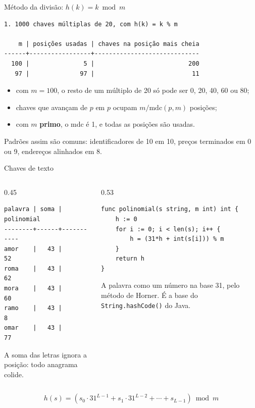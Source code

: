 \documentclass{beamer}
\begin{document}
\begin{frame}[fragile]{Método da divisão: $h(k) = k \bmod m$}
	\begin{verbatim}
1. 1000 chaves múltiplas de 20, com h(k) = k % m

    m | posições usadas | chaves na posição mais cheia
------+-----------------+-----------------------------
  100 |               5 |                          200
   97 |              97 |                           11
\end{verbatim}

	\vspace{0.2cm}
	\begin{itemize}
		\item com $m = 100$, o resto de um múltiplo de 20 só pode ser 0, 20, 40, 60
		      ou 80;
		\item chaves que avançam de $p$ em $p$ ocupam $m / \text{mdc}(p, m)$
		      posições;
		\item com $m$ \textbf{primo}, o mdc é 1, e todas as posições são usadas.
	\end{itemize}

	\vspace{0.2cm}
	\footnotesize Padrões assim são comuns: identificadores de 10 em 10, preços
	terminados em 0 ou 9, endereços alinhados em 8.
\end{frame}

\begin{frame}[fragile]{Chaves de texto}
	\begin{columns}
		\begin{column}{0.45\textwidth}
			\begin{verbatim}
palavra | soma | polinomial
--------+------+-----------
amor    |   43 |         52
roma    |   43 |         62
mora    |   43 |         60
ramo    |   43 |          8
omar    |   43 |         77
\end{verbatim}
			\footnotesize A soma das letras ignora a posição: todo anagrama colide.
		\end{column}
		\begin{column}{0.53\textwidth}
			\begin{verbatim}
func polinomial(s string, m int) int {
	h := 0
	for i := 0; i < len(s); i++ {
		h = (31*h + int(s[i])) % m
	}
	return h
}
\end{verbatim}
			\footnotesize A palavra como um número na base 31, pelo método de Horner. É a
			base do \texttt{String.hashCode()} do Java.
		\end{column}
	\end{columns}

	\vspace{0.3cm}
	\[
		h(s) = \left(s_0 \cdot 31^{L-1} + s_1 \cdot 31^{L-2} + \cdots + s_{L-1}\right) \bmod m
	\]
\end{frame}
\end{document}
